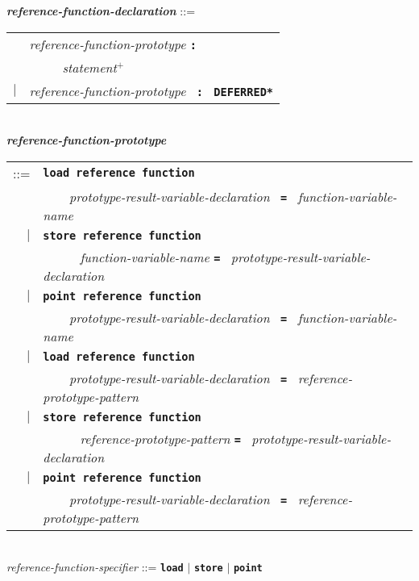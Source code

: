 \documentclass[12pt]{article}
\newcommand{\TT}[1]{{\tt \bfseries #1}}
\newcommand{\PLUS}[1][]{{$^{+#1}$}}
\newcommand{\ttkey}[1]{{\tt \bfseries #1}}
\newcommand{\emkey}[1]{{\em \bfseries #1}}
\newenvironment{indpar}[1][0.3in]%
	{\begin{list}{}%
		     {\setlength{\itemsep}{0in}%
		      \setlength{\topsep}{0in}%
		      \setlength{\parsep}{1ex}%
		      \setlength{\labelwidth}{#1}%
		      \setlength{\leftmargin}{#1}%
		      \addtolength{\leftmargin}{\labelsep}}%
	 \item}%
	{\end{list}}
\begin{document}
\begin{indpar}[0.1in]
\emkey{reference-function-declaration}\label{REFERENCE-FUNCTION-DECLARATION}
	::= \\
\hspace*{2em}
    \begin{tabular}[t]{rl}
        &  {\em reference-function-prototype} \TT{:} \\
	& \TT{~~~~~}{\em statement}\PLUS{} \\
    $|$ &  {\em reference-function-prototype}~ \TT{:}~ \ttkey{*DEFERRED*} \\
    \end{tabular}
\\[2ex]
\emkey{reference-function-prototype}\label{REFERENCE-FUNCTION-PROTOTYPE} \\
\hspace*{0.25in}
    \begin{tabular}[t]{rl}
        ::= & \ttkey{load reference function} \\
	    & \TT{~~~~}{\em prototype-result-variable-declaration}~ \TT{=}~
            	{\em function-variable-name} \\
        $|$ & \ttkey{store reference function} \\
	    & \TT{~~~~}~ {\em function-variable-name} \TT{=}~
            	{\em prototype-result-variable-declaration} \\
        $|$ & \ttkey{point reference function} \\
	    & \TT{~~~~}{\em prototype-result-variable-declaration}~ \TT{=}~
            	{\em function-variable-name} \\
        $|$ & \ttkey{load reference function} \\
	    & \TT{~~~~}{\em prototype-result-variable-declaration}~ \TT{=}~
	        {\em reference-prototype-pattern} \\
        $|$ & \ttkey{store reference function} \\
	    & \TT{~~~~}~ {\em reference-prototype-pattern} \TT{=}~
	        {\em prototype-result-variable-declaration} \\
        $|$ & \ttkey{point reference function} \\
	    & \TT{~~~~}{\em prototype-result-variable-declaration}~ \TT{=}~
	        {\em reference-prototype-pattern} \\
    \end{tabular}
\\[0.5ex]
{\em reference-function-specifier} ::=
    \ttkey{load} $|$ \ttkey{store} $|$ \ttkey{point}

\end{indpar}
\end{document}
